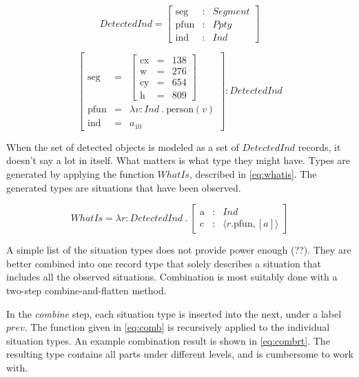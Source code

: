 \documentclass[11pt, a4paper]{article}
\begin{document}
\begin{equation}\label{eq:detind}
DetectedInd = \left[\begin{array}{rcl}
\text{seg} &:& Segment\\
\text{pfun} &:& Ppty \\
\text{ind} &:& Ind
\end{array}\right]\end{equation}

\begin{equation}\label{eq:detindrec}
\left[\begin{array}{rcl}
\text{seg} &=& \left[\begin{array}{rcl}
\text{cx} &=& 138\\
\text{w} &=& 276\\
\text{cy} &=& 654\\
\text{h} &=& 809
\end{array}\right]\\
\text{pfun} &=& \lambda v:Ind\ .\ \text{person}(v)\\
\text{ind} &=& a_{10}
\end{array}\right] : DetectedInd\end{equation}

When the set of detected objects is modeled as a set of $DetectedInd$ records, it doesn't say a lot in itself.
What matters is what type they might have.
Types are generated by applying the function $WhatIs$, described in \autoref{eq:whatis}.
The generated types are situations that have been observed.

\begin{equation}\label{eq:whatis}
WhatIs = \lambda r:DetectedInd\ .\ \left[\begin{array}{rcl}
\text{a} &:& Ind\\
\text{c} &:& \langle r.\text{pfun}, [a]\rangle
\end{array}\right]\end{equation}

A simple list of the situation types does not provide power enough (??).
They are better combined into one record type that solely describes a situation that includes all the observed situations. Combination is most suitably done with a two-step combine-and-flatten method.

In the \textit{combine} step, each situation type is inserted into the next, under a label $prev$.
The function given in \autoref{eq:comb} is recursively applied to the individual situation types.
An example combination result is shown in \autoref{eq:combrt}.
The resulting type contains all parts under different levels, and is cumbersome to work with.
\end{document}

